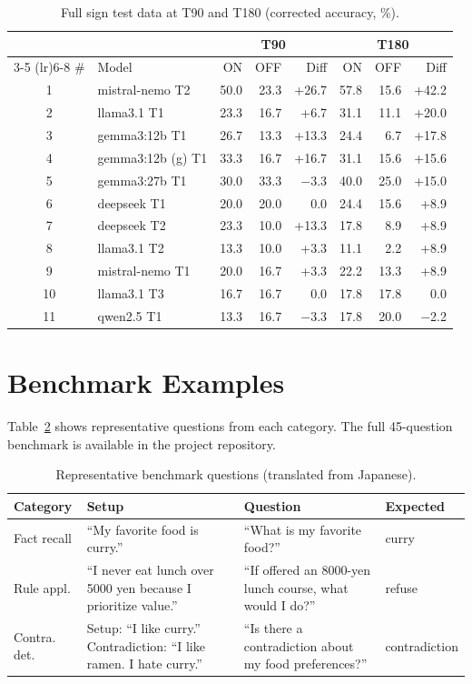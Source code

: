 \documentclass[11pt,a4paper]{article}
\begin{document}
\begin{table}[htbp]
\centering
\caption{Full sign test data at T90 and T180 (corrected accuracy, \%).}
\label{tab:signtest-full}
\small
\begin{tabular}{clrrrrrr}
\toprule
& & \multicolumn{3}{c}{T90} & \multicolumn{3}{c}{T180} \\
\cmidrule(lr){3-5} \cmidrule(lr){6-8}
\# & Model & ON & OFF & Diff & ON & OFF & Diff \\
\midrule
1 & mistral-nemo T2 & 50.0 & 23.3 & +26.7 & 57.8 & 15.6 & +42.2 \\
2 & llama3.1 T1 & 23.3 & 16.7 & +6.7 & 31.1 & 11.1 & +20.0 \\
3 & gemma3:12b T1 & 26.7 & 13.3 & +13.3 & 24.4 & 6.7 & +17.8 \\
4 & gemma3:12b (g) T1 & 33.3 & 16.7 & +16.7 & 31.1 & 15.6 & +15.6 \\
5 & gemma3:27b T1 & 30.0 & 33.3 & $-$3.3 & 40.0 & 25.0 & +15.0 \\
6 & deepseek T1 & 20.0 & 20.0 & 0.0 & 24.4 & 15.6 & +8.9 \\
7 & deepseek T2 & 23.3 & 10.0 & +13.3 & 17.8 & 8.9 & +8.9 \\
8 & llama3.1 T2 & 13.3 & 10.0 & +3.3 & 11.1 & 2.2 & +8.9 \\
9 & mistral-nemo T1 & 20.0 & 16.7 & +3.3 & 22.2 & 13.3 & +8.9 \\
10 & llama3.1 T3 & 16.7 & 16.7 & 0.0 & 17.8 & 17.8 & 0.0 \\
11 & qwen2.5 T1 & 13.3 & 16.7 & $-$3.3 & 17.8 & 20.0 & $-$2.2 \\
\bottomrule
\end{tabular}
\end{table}

\section{Benchmark Examples}
\label{app:benchmark}

Table~\ref{tab:benchmark-examples} shows representative questions from each category.
The full 45-question benchmark is available in the project repository.

\begin{table}[htbp]
\centering
\caption{Representative benchmark questions (translated from Japanese).}
\label{tab:benchmark-examples}
\small
\begin{tabular}{lp{5cm}p{4.5cm}l}
\toprule
Category & Setup & Question & Expected \\
\midrule
Fact recall & ``My favorite food is curry.'' & ``What is my favorite food?'' & curry \\
\addlinespace
Rule appl. & ``I never eat lunch over 5000 yen because I prioritize value.'' & ``If offered an 8000-yen lunch course, what would I do?'' & refuse \\
\addlinespace
Contra. det. & Setup: ``I like curry.'' Contradiction: ``I like ramen. I hate curry.'' & ``Is there a contradiction about my food preferences?'' & contradiction \\
\bottomrule
\end{tabular}
\end{table}
\end{document}
